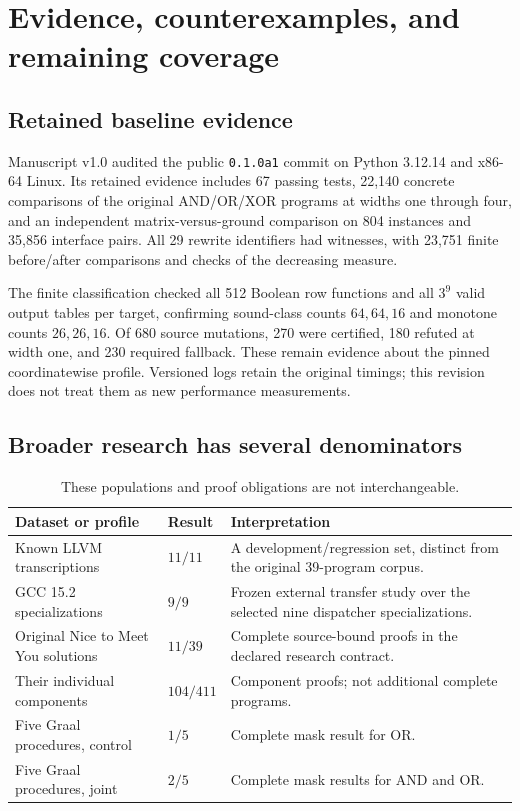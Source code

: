 \section{Evidence, counterexamples, and remaining coverage}\label{sec:experiments}

\subsection{Retained baseline evidence}
Manuscript v1.0 audited the public \texttt{0.1.0a1} commit on Python 3.12.14 and x86-64 Linux. Its retained evidence includes 67 passing tests, 22,140 concrete comparisons of the original AND/OR/XOR programs at widths one through four, and an independent matrix-versus-ground comparison on 804 instances and 35,856 interface pairs. All 29 rewrite identifiers had witnesses, with 23,751 finite before/after comparisons and checks of the decreasing measure.

The finite classification checked all 512 Boolean row functions and all $3^9$ valid output tables per target, confirming sound-class counts $64,64,16$ and monotone counts $26,26,16$. Of 680 source mutations, 270 were certified, 180 refuted at width one, and 230 required fallback. These remain evidence about the pinned coordinatewise profile. Versioned logs retain the original timings; this revision does not treat them as new performance measurements.

\subsection{Broader research has several denominators}
\begin{table}[htbp]\small
\begin{tabularx}{\textwidth}{@{}l l X@{}}
\toprule
Dataset or profile & Result & Interpretation\\
\midrule
Known LLVM transcriptions & $11/11$ & A development/regression set, distinct from the original 39-program corpus.\\
GCC 15.2 specializations & $9/9$ & Frozen external transfer study over the selected nine dispatcher specializations.\\
Original Nice to Meet You solutions & $11/39$ & Complete source-bound proofs in the declared research contract.\\
Their individual components & $104/411$ & Component proofs; not additional complete programs.\\
Five Graal procedures, control & $1/5$ & Complete mask result for OR.\\
Five Graal procedures, joint & $2/5$ & Complete mask results for AND and OR.\\
\bottomrule
\end{tabularx}
\caption{These populations and proof obligations are not interchangeable.}\label{tab:coverage}
\end{table}


